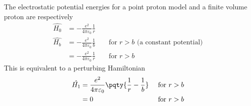 \documentclass[12pt]{article}
\begin{document}
        \subsection{} The electrostatic potential energies for a point proton model and a finite volume proton are respectively \begin{align*}
            \hat{H_0} &= - \frac{e^2}{4\pi \varepsilon_0}\frac{1}{r}\\
            \hat{H_b} &= - \frac{e^2}{4\pi \varepsilon_0}\frac{1}{b}&&\text{ for }r > b\text{ (a constant potential)}\\ &= - \frac{e^2}{4\pi \varepsilon_0}\frac{1}{r}&&\text{ for }r > b
        \end{align*}
        This is equivalent to a perturbing Hamiltonian \begin{align*}
            \hat{H_1} &= \frac{e^2}{4\pi \varepsilon_0}\pqty{\frac{1}{r} - \frac{1}{b}}&\text{ for }r > b\\ &= 0&\text{ for }r > b
        \end{align*}
\end{document}

